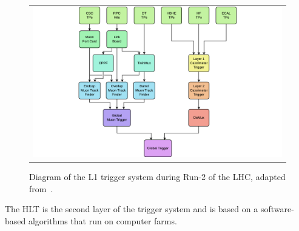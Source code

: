 \begin{figure}[tbh!]
 \begin{center}
 \begin{tabular}{c}
 \includegraphics[width=1\textwidth]{figures/Part2/CMS/L1T}
 \end{tabular}
 \caption{Diagram of the \ac{L1} trigger system during Run-2 of the \ac{LHC}, adapted from~\cite{CMS:2020cmk}.}
 \label{fig:L1T}
 \end{center}
\end{figure}

The \ac{HLT} is the second layer of the trigger system and is based on a software-based algorithms that run on computer farms. 